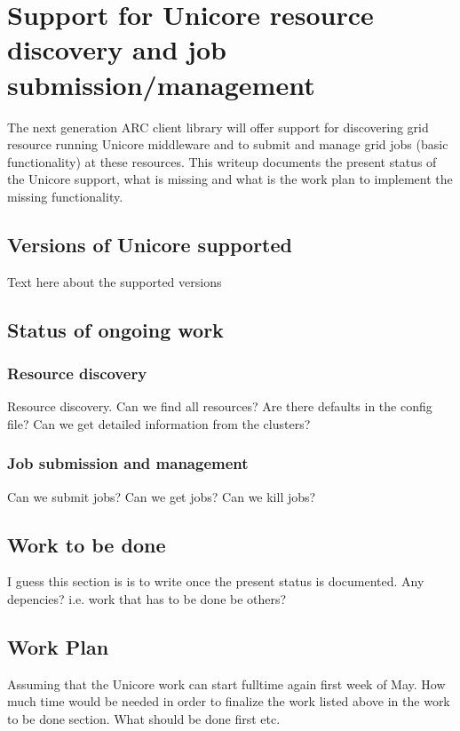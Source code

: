 \documentclass[11pt,oneside,a4paper,english]{article}
\begin{document}
\section*{Support for Unicore resource discovery and job submission/management}
The next generation ARC client library will offer support for discovering grid resource running Unicore middleware and to submit and manage grid jobs (basic functionality) at these resources. This writeup documents the present status of the Unicore support, what is missing and what is the work plan to implement the missing functionality.
\subsection*{Versions of Unicore supported}
Text here about the supported versions
\subsection*{Status of ongoing work}
\subsubsection*{Resource discovery}
Resource discovery. Can we find all resources? Are there defaults in the config file? Can we get detailed information from the clusters?
\subsubsection*{Job submission and management}
Can we submit jobs? Can we get jobs? Can we kill jobs?

\subsection*{Work to be done}
I guess this section is is to write once the present status is documented. Any depencies? i.e. work that has to be done be others?

\subsection*{Work Plan}
Assuming that the Unicore work can start fulltime again first week of May. How much time would be needed in order to finalize the work listed above in the work to be done section. What should be done first etc. 
\end{document}
